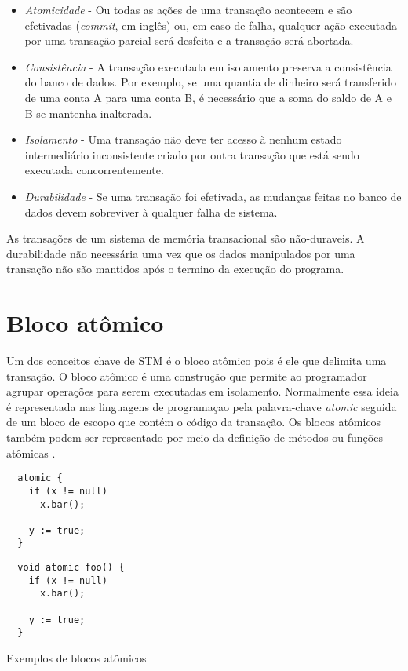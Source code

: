 \begin{itemize}
 \item \emph{Atomicidade} - Ou todas as ações de uma transação acontecem e são efetivadas (\emph{commit}, em inglês) ou, em caso de falha, qualquer ação executada por uma transação parcial será desfeita e a transação será abortada.
 \item \emph{Consistência} - A transação executada em isolamento preserva a consistência do banco de dados. Por exemplo, se uma quantia de dinheiro será transferido de uma conta A para uma conta B, é necessário que a soma do saldo de A e B se mantenha inalterada.
 \item \emph{Isolamento} - Uma transação não deve ter acesso à nenhum estado intermediário inconsistente criado por outra transação que está sendo executada concorrentemente.
 \item \emph{Durabilidade} - Se uma transação foi efetivada, as mudanças feitas no banco de dados devem sobreviver à qualquer falha de sistema.
\end{itemize}

As transações de um sistema de memória transacional são não-duraveis. A durabilidade não necessária uma vez que os dados manipulados por uma transação não são mantidos após o termino da execução do programa. \cite{harris2010transactional}


\section{Bloco atômico}

Um dos conceitos chave de STM é o bloco atômico pois é ele que delimita uma transação. O bloco atômico é uma construção que permite ao programador agrupar operações para serem executadas em isolamento. Normalmente essa ideia é representada nas linguagens de programaçao pela palavra-chave \emph{atomic} seguida de um bloco de escopo que contém o código da transação. Os blocos atômicos também podem ser representado por meio da definição de métodos ou funções atômicas \cite{harris2010transactional}.

\begin{listing}[!h]
 \begin{minipage}{0.5\textwidth}
  \centering
  \begin{verbatim}
  atomic {
    if (x != null)
      x.bar();
    
    y := true;
  }
  \end{verbatim}
 \end{minipage}
 \begin{minipage}{0.5\textwidth}
  \centering
  \begin{verbatim}
  void atomic foo() {
    if (x != null)
      x.bar();
    
    y := true;
  }
  \end{verbatim}
 \end{minipage}
 \caption{Exemplos de blocos atômicos}
\end{listing}

